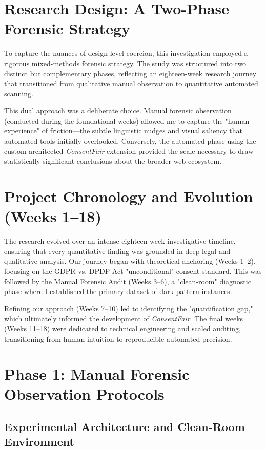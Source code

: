 \documentclass[12pt,a4paper]{report}
\begin{document}
\newpage

\section{Research Design: A Two-Phase Forensic Strategy}

To capture the nuances of design-level coercion, this investigation employed a rigorous mixed-methods forensic strategy. The study was structured into two distinct but complementary phases, reflecting an eighteen-week research journey that transitioned from qualitative manual observation to quantitative automated scanning. 

This dual approach was a deliberate choice. Manual forensic observation (conducted during the foundational weeks) allowed me to capture the "human experience" of friction—the subtle linguistic nudges and visual saliency that automated tools initially overlooked. Conversely, the automated phase using the custom-architected \textit{ConsentFair} extension provided the scale necessary to draw statistically significant conclusions about the broader web ecosystem.

\section{Project Chronology and Evolution (Weeks 1--18)}

The research evolved over an intense eighteen-week investigative timeline, ensuring that every quantitative finding was grounded in deep legal and qualitative analysis. Our journey began with theoretical anchoring (Weeks 1--2), focusing on the GDPR vs. DPDP Act "unconditional" consent standard. This was followed by the Manual Forensic Audit (Weeks 3--6), a "clean-room" diagnostic phase where I established the primary dataset of dark pattern instances.

Refining our approach (Weeks 7--10) led to identifying the "quantification gap," which ultimately informed the development of \textit{ConsentFair}. The final weeks (Weeks 11--18) were dedicated to technical engineering and scaled auditing, transitioning from human intuition to reproducible automated precision.

\section{Phase 1: Manual Forensic Observation Protocols}

\subsection{Experimental Architecture and Clean-Room Environment}
\end{document}
